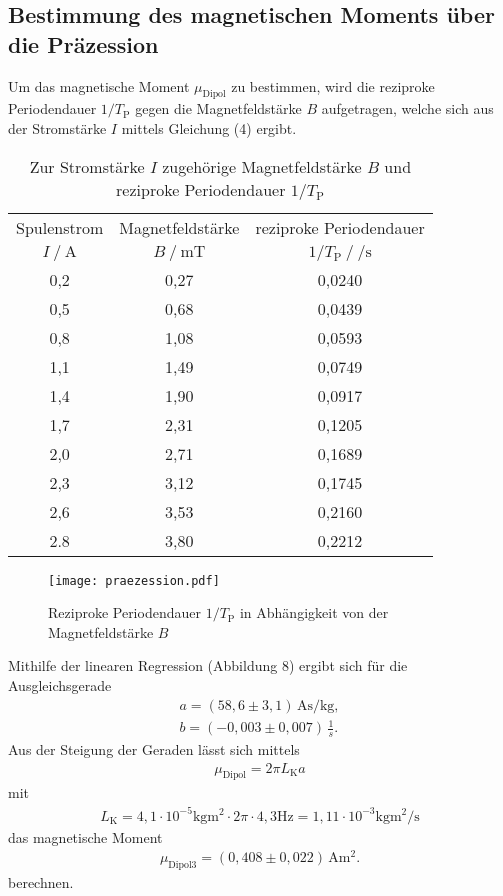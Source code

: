 \subsection{Bestimmung des magnetischen Moments über die Präzession} %
Um das magnetische Moment $\mu_\text{Dipol}$ zu bestimmen, wird die reziproke Periodendauer $1/T_\text{P}$
gegen die Magnetfeldstärke $B$ aufgetragen, welche sich aus der Stromstärke $I$ mittels Gleichung (4) ergibt.
\begin{table}
\centering
\caption{Zur Stromstärke $I$ zugehörige Magnetfeldstärke $B$ und reziproke Periodendauer $1/T_\text{P}$}
\label{tab:praezession}
\begin{tabular}{c c c}
\toprule
\multicolumn{1}{c}{Spulenstrom} & \multicolumn{1}{c}{Magnetfeldstärke} & \multicolumn{1}{c}{reziproke Periodendauer} \\
{$I\:/\:\si{\ampere}$} & {$B\:/\:\si{\milli\tesla}$} & {$1/T_\text{P}\:/\:\si{\per\second}$} \\
\midrule
0,2 & 0,27 & 0,0240 \\
0,5 & 0,68 & 0,0439 \\
0,8 & 1,08 & 0,0593 \\
1,1 & 1,49 & 0,0749 \\
1,4 & 1,90 & 0,0917 \\
1,7 & 2,31 & 0,1205 \\
2,0 & 2,71 & 0,1689 \\
2,3 & 3,12 & 0,1745 \\
2,6 & 3,53 & 0,2160 \\
2.8 & 3,80 & 0,2212 \\
\bottomrule
\end{tabular}
\end{table}
\begin{figure}
  \center
  \texttt{[image: praezession.pdf]}
  \caption{Reziproke Periodendauer $1/T_\text{P}$ in Abhängigkeit von der Magnetfeldstärke $B$}
  \label{fig:praezession}
\end{figure}
\noindent Mithilfe der linearen Regression (Abbildung 8) ergibt sich für die Ausgleichsgerade
\begin{align*}
a = (58,6 \pm 3,1)\,\si{\ampere\second\per\kilo\gram}, \\
b = (-0,003 \pm 0,007)\,\frac{1}{s}.
\end{align*}
Aus der Steigung der Geraden lässt sich mittels
\begin{gather}
\mu_\text{Dipol} = 2\pi L_\text{K} a
\end{gather}
mit
\begin{gather*}
L_\text{K} = 4,1 \cdot 10^{-5} \si{\kilo\gram\meter\squared} \cdot 2\pi \cdot 4,3\si{\hertz} = 1,11 \cdot 10^{-3} \si{\kilo\gram\meter\squared\per\second}
\end{gather*}
das magnetische Moment
\begin{gather*}
\mu_\text{Dipol3} = (0,408 \pm 0,022)\,\si{\ampere\meter\squared}.
\end{gather*}
berechnen.